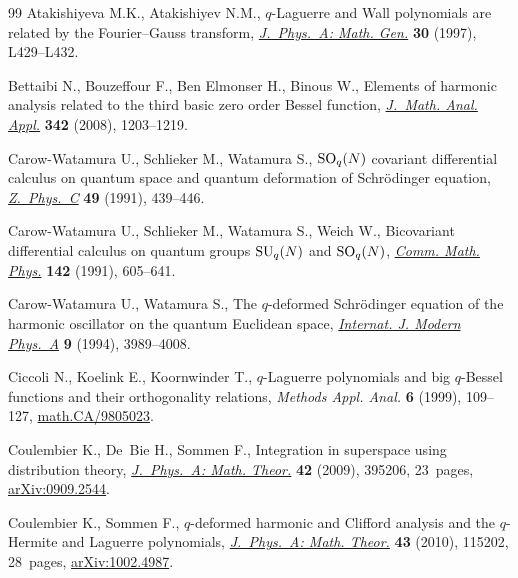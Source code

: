 \documentclass[11pt]{article}
\numberwithin{equation}{section}
\begin{document}
\begin{thebibliography}{99}
Atakishiyeva M.K., Atakishiyev N.M.,
$q$-Laguerre and Wall polynomials are related by the Fourier--Gauss transform,
\href{http://dx.doi.org/10.1088/0305-4470/30/13/001}{{\it J.~Phys.~A: Math. Gen.}} {\bf 30} (1997), L429--L432.


Bettaibi N., Bouzef\/four F., Ben Elmonser H., Binous W.,
Elements of harmonic analysis related to the third basic zero order Bessel function,
\href{http://dx.doi.org/10.1016/j.jmaa.2008.01.006}{{\it J.~Math. Anal. Appl.}} {\bf 342} (2008),   1203--1219.

Carow-Watamura U., Schlieker M., Watamura S.,
${\rm SO}\sb q(N)$ covariant dif\/ferential calculus on quantum space and quantum deformation of Schr\"odinger equation,
\href{http://dx.doi.org/10.1007/BF01549697}{{\it Z.~Phys.~C}} {\bf 49} (1991), 439--446.

Carow-Watamura U., Schlieker M., Watamura S., Weich W.,
Bicovariant dif\/ferential calculus on quantum groups ${\rm SU}_q(N)$ and ${\rm SO}_q(N)$,
\href{http://dx.doi.org/10.1007/BF02099103}{{\it Comm. Math. Phys.}} {\bf142} (1991), 605--641.

Carow-Watamura U., Watamura S.,
The $q$-deformed Schr\"odinger equation of the harmonic oscillator on the quantum Euclidean space,
\href{http://dx.doi.org/10.1142/S0217751X94001618}{{\it Internat. J. Modern Phys.~A}} {\bf 9} (1994), 3989--4008.

Ciccoli N., Koelink E., Koornwinder T.,
$q$-Laguerre polynomials and big $q$-Bessel functions and their orthogonality relations,
 {\it Methods Appl. Anal.} {\bf6} (1999), 109--127,
\href{http://arxiv.org/abs/math.CA/9805023}{math.CA/9805023}.

Coulembier K., De~Bie H., Sommen F.,
Integration in superspace using distribution theory,
\href{http://dx.doi.org/10.1088/1751-8113/42/39/395206}{{\it J.~Phys.~A: Math. Theor.}} {\bf42} (2009), 395206, 23~pages,
\href{http://arxiv.org/abs/0909.2544}{arXiv:0909.2544}.

Coulembier K., Sommen F.,
$q$-deformed harmonic and Clif\/ford analysis and the $q$-Hermite and Laguerre polynomials,
\href{http://dx.doi.org/10.1088/1751-8113/43/11/115202}{{\it  J.~Phys.~A: Math. Theor.}} {\bf 43} (2010), 115202, 28~pages,
\href{http://arxiv.org/abs/1002.4987}{arXiv:1002.4987}.


\end{thebibliography}
\end{document}

